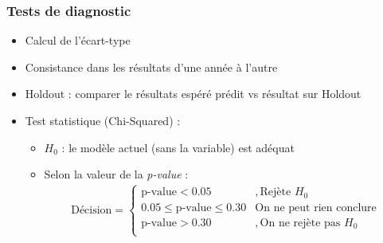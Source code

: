 \subsubsection{Tests de diagnostic}
\begin{itemize}
\item Calcul de l'écart-type
\item Consistance dans les résultats d'une année à l'autre
\item Holdout : comparer le résultats espéré prédit vs résultat sur Holdout
\item Test statistique (Chi-Squared) :
\begin{itemize}
	\item $H_0$ : le modèle actuel (sans la variable) est adéquat
	\item Selon la valeur de la \textit{p-value} : 
	\begin{align*}
\text{Décision} = 
\begin{cases}
\text{p-value} < 0.05 & , \text{Rejète } H_0 \\
0.05 \leq \text{p-value} \leq 0.30 & \text{On ne peut rien conclure} \\
\text{p-value} > 0.30 & , \text{On ne rejète pas } H_0 \\
\end{cases}
\end{align*}
\end{itemize}
\end{itemize}
